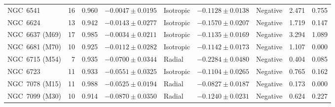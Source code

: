 \begin{table}
\begin{tabular}{lrrclclrr}
NGC~6541 & 16 & 0.960 & $-0.0047\pm0.0195$ & Isotropic & $-0.1128\pm0.0138$ & Negative & 2.471 & 0.755 \\
NGC~6624 & 13 & 0.942 & $-0.0143\pm0.0277$ & Isotropic & $-0.1570\pm0.0207$ & Negative & 1.719 & 0.147 \\
NGC~6637 (M69) & 17 & 0.985 & $-0.0034\pm0.0211$ & Isotropic & $-0.1135\pm0.0169$ & Negative & 3.294 & 1.089 \\
NGC~6681 (M70) & 10 & 0.925 & $-0.0112\pm0.0282$ & Isotropic & $-0.1142\pm0.0173$ & Negative & 1.107 & 0.000 \\
NGC~6715 (M54) & 7 & 0.935 & $-0.0700\pm0.0344$ & Radial & $-0.2284\pm0.0480$ & Negative & 0.404 & 0.085 \\
NGC~6723 & 11 & 0.933 & $-0.0551\pm0.0325$ & Isotropic & $-0.1104\pm0.0265$ & Negative & 0.765 & 0.162 \\
NGC~7078 (M15) & 11 & 0.988 & $-0.0525\pm0.0194$ & Radial & $-0.0827\pm0.0187$ & Negative & 0.173 & 0.000 \\
NGC~7099 (M30) & 10 & 0.914 & $-0.0870\pm0.0350$ & Radial & $-0.1240\pm0.0231$ & Negative & 0.624 & 0.227 \\
\hline
\end{tabular}
\end{table}